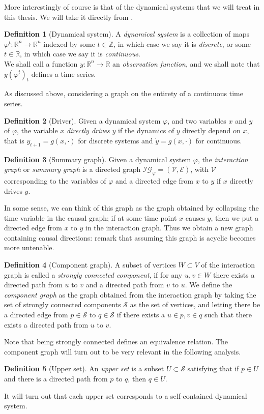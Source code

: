 \documentclass[11pt, a4paper]{memoir}
\theoremstyle{plain}
\theoremstyle{definition}
\newtheorem{defn}{Definition}
\newcommand{\mZ}{\mathbb{Z}}
\newcommand{\mR}{\mathbb{R}}
\begin{document}
More interestingly of course is that of the dynamical systems that we will treat in this thesis. We will take it directly from \cite{mathFound}.
\begin{defn}[Dynamical system]
A \emph{dynamical system} is a collection of maps $\varphi^t:\mR^n\to\mR^n$ indexed by some $t\in \mZ$, in which case we say it is \emph{discrete}, or some $t\in \mR$, in which case we say it is \emph{continuous}.\\
We shall call a function $y:\mR^n\to \mR$ an \emph{observation function}, and we shall note that $y(\varphi^t)_t$ defines a time series.
\end{defn}
As discussed above, considering a graph on the entirety of a continuous time series.
\begin{defn}[Driver]
Given a dynamical system $\varphi$, and two variables $x$ and $y$ of $\varphi$, the variable $x$ \emph{directly drives} $y$ if the dynamics of $y$ directly depend on $x$, that is $y_{t+1}=g(x,\cdot)$ for discrete systems and $\dot{y}=g(x,\cdot)$ for continuous.
\end{defn}
\begin{defn}[Summary graph]
Given a dynamical system $\varphi$, the \emph{interaction graph} or \emph{summary graph} is a directed graph $\mathcal{IG}_\varphi=(\mathcal{V},\mathcal{E})$, with $\mathcal{V}$ corresponding to the variables of $\varphi$ and a directed edge from $x$ to $y$ if $x$ directly drives $y$.
\end{defn}
In some sense, we can think of this graph as the graph obtained by collapsing the time variable in the causal graph; if at some time point $x$ causes $y$, then we put a directed edge from $x$ to $y$ in the interaction graph. Thus we obtain a new graph containing causal directions: remark that assuming this graph is acyclic becomes more untenable.
\begin{defn}[Component graph]
A subset of vertices $W\subset V$ of the interaction graph is called a \emph{strongly connected component}, if for any $u,v\in W$ there exists a directed path from $u$ to $v$ and a directed path from $v$ to $u$. We define the \emph{component graph} as the graph obtained from the interaction graph by taking the set of strongly connected components $\mathcal{S}$ as the set of vertices, and letting there be a directed edge from $p\in \mathcal{S}$ to $q\in \mathcal{S}$ if there exists a $u\in p,v\in q$ such that there exists a directed path from $u$ to $v$.
\end{defn}
Note that being strongly connected defines an equivalence relation. The component graph will turn out to be very relevant in the following analysis.
\begin{defn}[Upper set]
An \emph{upper set} is a subset $U\subset \mathcal{S}$ satisfying that if $p\in U$ and there is a directed path from $p$ to $q$, then $q\in U$.
\end{defn}
It will turn out that each upper set corresponds to a self-contained dynamical system.
\end{document}
